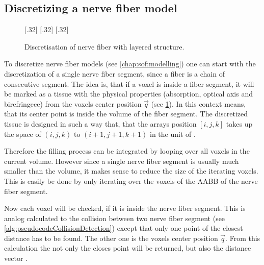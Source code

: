 \subsection{Discretizing a nerve fiber model}
% 
\begin{figure}[!t]
\centering
\setlength{\tikzwidth}{0.32\textwidth}
[.32\textwidth]{
}
[.32\textwidth]{
}
[.32\textwidth]{
} \hfill
\caption{Discretisation of nerve fiber with layered structure.}
\label{fig:fiber_discretisation}
\end{figure}
% 
To discretize nerve fiber models (see \cref{chap:sof:modelling}) one can start with the discretization of a single nerve fiber segment, since a fiber is a chain of consecutive segment.
The idea is, that if a voxel is inside a fiber segment, it will be marked as a tissue with the physical properties (absorption, optical axis and birefringece) from the voxels center position $\vec{q}$ (see \cref{fig:fiber_discretisation}).
In this context  means, that its center point is inside the volume of the fiber segment.
The discretized tissue is designed in such a way that, that the arrays position $[i,j,k]$ takes up the space of $(i,j,k)$ to $(i+1,j+1,k+1)$ in the unit of \voxelsize{}.
\par
% 
Therefore the filling process can be integrated by looping over all voxels in the current volume.
However since a single nerve fiber segment is usually much smaller than the volume, it makes sense to reduce the size of the iterating voxels.
This is easily be done by only iterating over the voxels of the \ac{AABB} of the nerve fiber segment.
\par
% 
Now each voxel will be checked, if it is inside the nerve fiber segment.
This is analog calculated to the collision between two nerve fiber segment (see \cref{alg:pseudocodeCollisionDetection}) except that only one point of the closest distance has to be found.
The other one is the voxels center position $\vec{q}$.
From this calculation the not only the closes point \dummy{} will be returned, but also the distance vector \dummy{}. 
